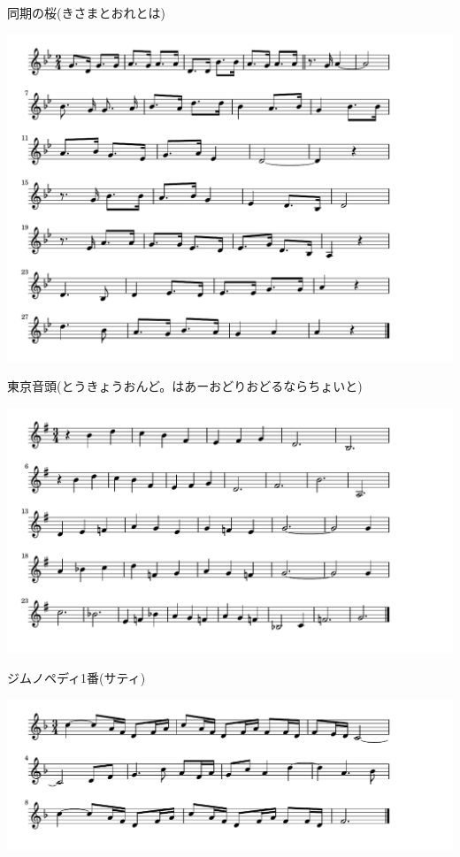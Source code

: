 \documentclass[a4paper]{ltjsarticle}
\begin{document}
\vspace{-10mm} \hspace{10mm}
同期の桜(きさまとおれとは)

\includegraphics[clip]{tokyoondo_crop.pdf}

\vspace{-10mm} \hspace{10mm}
東京音頭(とうきょうおんど。はあーおどりおどるならちょいと)

\includegraphics[clip]{gymnopedies_crop.pdf}

\vspace{-10mm} \hspace{10mm}
ジムノペディ1番(サティ)

\includegraphics[clip]{amairodebussy_crop.pdf}
\end{document}
